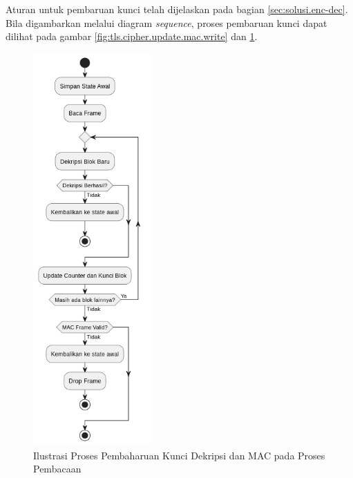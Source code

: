 Aturan untuk pembaruan kunci telah dijelaskan pada bagian \ref{sec:solusi.enc-dec}. Bila digambarkan melalui diagram \emph{sequence}, proses pembaruan kunci dapat dilihat pada gambar \ref{fig:tls.cipher.update.mac.write} dan \ref{fig:tls.cipher.update.mac.read}.


\begin{figure}[!h]
  \centering
  \includegraphics[width=170px]{chapters/res/chapter-3/img/update.write.png}
  \caption{Ilustrasi Proses Pembaharuan Kunci Dekripsi dan MAC pada Proses Pembacaan} \label{fig:tls.cipher.update.mac.read}
\end{figure}

